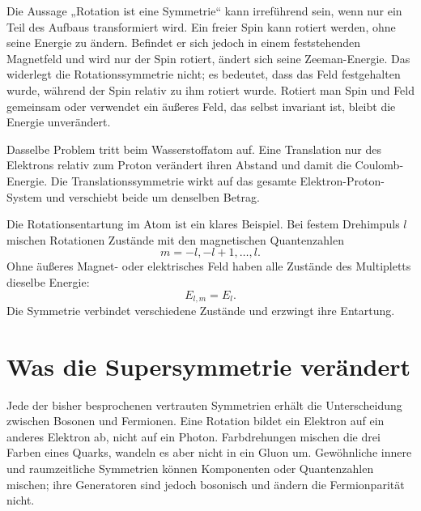 Die Aussage „Rotation ist eine Symmetrie“ kann irreführend sein, wenn nur ein Teil des Aufbaus transformiert wird. Ein freier Spin kann rotiert werden, ohne seine Energie zu ändern. Befindet er sich jedoch in einem feststehenden Magnetfeld und wird nur der Spin rotiert, ändert sich seine Zeeman-Energie. Das widerlegt die Rotationssymmetrie nicht; es bedeutet, dass das Feld festgehalten wurde, während der Spin relativ zu ihm rotiert wurde. Rotiert man Spin und Feld gemeinsam oder verwendet ein äußeres Feld, das selbst invariant ist, bleibt die Energie unverändert.

Dasselbe Problem tritt beim Wasserstoffatom auf. Eine Translation nur des Elektrons relativ zum Proton verändert ihren Abstand und damit die Coulomb-Energie. Die Translationssymmetrie wirkt auf das gesamte Elektron-Proton-System und verschiebt beide um denselben Betrag.

\begin{classroomqa}
\end{classroomqa}

Die Rotationsentartung im Atom ist ein klares Beispiel. Bei festem Drehimpuls \(l\) mischen Rotationen Zustände mit den magnetischen Quantenzahlen
\begin{equation}
m=-l,-l+1,\ldots,l.
\end{equation}
Ohne äußeres Magnet- oder elektrisches Feld haben alle Zustände des Multipletts dieselbe Energie:
\begin{equation}
E_{l,m}=E_l.
\end{equation}
Die Symmetrie verbindet verschiedene Zustände und erzwingt ihre Entartung.

\section{Was die Supersymmetrie verändert}

Jede der bisher besprochenen vertrauten Symmetrien erhält die Unterscheidung zwischen Bosonen und Fermionen. Eine Rotation bildet ein Elektron auf ein anderes Elektron ab, nicht auf ein Photon. Farbdrehungen mischen die drei Farben eines Quarks, wandeln es aber nicht in ein Gluon um. Gewöhnliche innere und raumzeitliche Symmetrien können Komponenten oder Quantenzahlen mischen; ihre Generatoren sind jedoch bosonisch und ändern die Fermionparität nicht.

